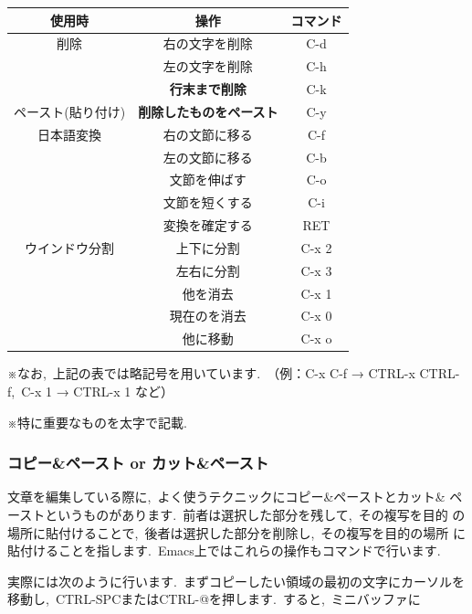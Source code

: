 \documentclass{jarticle}
\begin{document}
\begin{table}[H]
 \begin{minipage}{0.5\hsize}
  \begin{center}
  \begin{tabular}{|c|c|c|}\hline
    使用時 & 操作  & コマンド \\
  \hline
  削除  & 右の文字を削除 & C-d \\
        & 左の文字を削除 & C-h \\
        	& {\bf 行末まで削除} & C-k \\
      ペースト(貼り付け)   &  {\bf 削除したものをペースト} & C-y \\
日本語変換  & 右の文節に移る  & C-f  \\
                & 左の文節に移る  & C-b \\
                & 文節を伸ばす     & C-o  \\
                & 文節を短くする  & C-i \\
                &  変換を確定する  & RET \\
ウインドウ分割 & 上下に分割 & C-x 2\\
                      & 左右に分割 & C-x 3 \\
                      & 他を消去 & C-x 1  \\
                      & 現在のを消去 & C-x 0 \\
                      & 他に移動 & C-x o \\
  \hline
  \end{tabular}
  \end{center}
  \label{table:two}
 \end{minipage}
\end{table}

※なお,\ 上記の表では略記号を用いています.\ （例：C-x C-f → CTRL-x CTRL-f,\ 
C-x 1 → CTRL-x 1 など）

※特に重要なものを太字で記載.\ 

\subsubsection{コピー\&ペースト or カット\&ペースト}
文章を編集している際に,\ よく使うテクニックにコピー\&ペーストとカット\&
ペーストというものがあります.\ 前者は選択した部分を残して,\ その複写を目的
の場所に貼付けることで,\ 後者は選択した部分を削除し,\ その複写を目的の場所
に貼付けることを指します.\ Emacs上ではこれらの操作もコマンドで行います.\ 

実際には次のように行います.\ 
まずコピーしたい領域の最初の文字にカーソルを移動し,\ 
CTRL-SPCまたはCTRL-@を押します.\ 
すると,\ ミニバッファに
\end{document}
